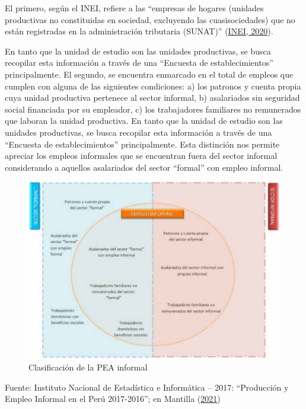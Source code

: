 \documentclass[
  letterpaper,
  12pt,
  oneside,
  spanish,
  doublespacing,
  headsepline,
  parskip]{MastersDoctoralThesis}
\begin{document}
El primero, según el INEI, refiere a las ``empresas de hogares (unidades
productivas no constituidas en sociedad, excluyendo las cuasisociedades)
que no están registradas en la administración tributaria (SUNAT)''
(\protect\hyperlink{ref-inei2020}{INEI, 2020}).

En tanto que la unidad de estudio son las unidades productivas, se busca
recopilar esta información a través de una ``Encuesta de
establecimientos'' principalmente. El segundo, se encuentra enmarcado en
el total de empleos que cumplen con alguna de las siguientes
condiciones: a) los patronos y cuenta propia cuya unidad productiva
pertenece al sector informal, b) asalariados sin seguridad social
financiada por su empleador, c) los trabajadores familiares no
remunerados que laboran la unidad productiva. En tanto que la unidad de
estudio son las unidades productivas, se busca recopilar esta
información a través de una ``Encuesta de establecimientos''
principalmente. Esta distinción nos permite apreciar los empleos
informales que se encuentran fuera del sector informal considerando a
aquellos asalariados del sector ``formal'' con empleo informal.

\begin{figure}

\caption{\label{fig-pea}Clasificación de la PEA informal}

{\centering \includegraphics[width=5.20833in,height=\textheight]{Chapters/../Figures/pea_informal1.pdf}

}

\end{figure}

\noindent \small Fuente: Instituto Nacional de Estadística e Informática
-- 2017: ``Producción y Empleo Informal en el Perú 2017-2016''; en
Mantilla (\protect\hyperlink{ref-mantilla2021}{2021}) \normalsize
\end{document}
